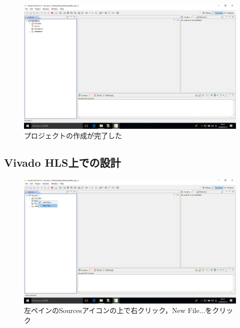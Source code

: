 \documentclass[a4paper,dvipdfmx]{jsarticle}
\begin{document}
 \begin{figure}[H]
  \begin{center}
   \includegraphics[width=.8\textwidth]{chapter08_figures/VirtualBox_Windows10_19_03_2018_23_11_08.png}
  \end{center}
  \caption{プロジェクトの作成が完了した}
 \end{figure}

 \subsection{Vivado HLS上での設計}

 \begin{figure}[H]
  \begin{center}
   \includegraphics[width=.8\textwidth]{chapter08_figures/VirtualBox_Windows10_19_03_2018_23_11_14.png}
  \end{center}
  \caption{左ペインのSourcesアイコンの上で右クリック，New File...をクリック}
 \end{figure}
\end{document}
